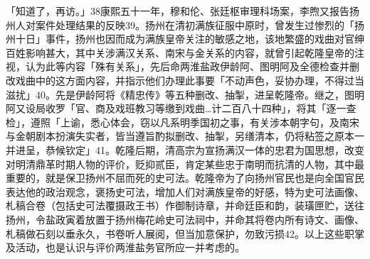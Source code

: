\noindent 「知道了，再访。」38康熙五十一年，穆和伦、张廷枢审理科场案，李煦又报告扬州人对案件处理结果的反映39。扬州在清初满族征服中原时，曾发生过惨烈的「扬州十日」事件，扬州也因而成为满族皇帝关注的敏感之地，该地繁盛的戏曲对官绅百姓影响甚大，其中关涉满汉关系、南宋与金关系的内容，就曾引起乾隆皇帝的注视，认为此等内容「殊有关系」，先后命两淮盐政伊龄阿、图明阿及全德检查并删改戏曲中的这方面内容，并指示他们办理此事要「不动声色，妥协办理，不得过当滋扰」40。先是伊龄阿将《精忠传》等五种删改、抽掣，进呈乾隆帝。继之，图明阿又设局收罗「官、商及戏班教习等缴到戏曲…计二百八十四种」，将其「逐一查检」，遵照「上谕，悉心体会，窃以凡系明季国初之事，有关涉本朝字句，及南宋与金朝剧本扮演失实者，皆当遵旨酌拟删改、抽掣，另缮清本，仍将粘签之原本一并进呈，恭候钦定」41。乾隆后期，清高宗为宣扬满汉一体的忠君为国思想，改变对明清鼎革时期人物的评价，贬抑贰臣，肯定某些忠于南明而抗清的人物，其中最重要的，就是保卫扬州不屈而死的史可法。乾隆帝为了向扬州官民也是向全国官民表达他的政治观念，褒扬史可法，增加人们对满族皇帝的好感，特为史可法画像、札稿合卷（包括史可法覆摄政王书）作御制诗章，并命廷臣和韵，装璜匣贮，送往扬州，令盐政寅着放置于扬州梅花岭史可法祠中，并命其将卷内所有诗文、画像、札稿做石刻以垂永久，书卷听人展阅，但当加意保护，勿致污损42。以上这些职掌及活动，也是认识与评价两淮盐务官所应一并考虑的。

\vfill
\begin{BookNotes}
\end{BookNotes}
